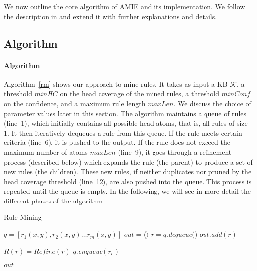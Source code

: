 
We now outline the core algorithm of AMIE and its implementation.
We follow the description in \cite{amie} and extend it with further explanations and details.

\subsection{Algorithm}
\label{subsec:algorithm}

\paragraph{Algorithm} Algorithm~\ref{rm} shows our approach to mine rules. It takes as input a KB $\mathcal{K}$, a threshold $minHC$ on the head coverage of the mined rules, 
a threshold $minConf$ on the confidence, and a maximum rule length $maxLen$. We discuss the choice of parameter values later in this section.
The algorithm maintains a queue of rules (line~1), which initially contains all possible head atoms, that is, all rules of size 1.
It then iteratively dequeues a rule from this queue.
If the rule meets certain criteria (line~6), it is pushed to the output.
If the rule does not exceed the maximum number of atoms $maxLen$ (line~9), it goes through a refinement process (described below) which
expands the rule (the parent) to produce a set of new rules (the children). These new rules, 
if neither duplicates nor pruned by the head coverage threshold (line~12),  
are also pushed into the queue.
This process is repeated until the queue is empty. 
In the following, we will see in more detail the different phases of the algorithm.

\begin{algorithm}
\caption{Rule Mining}
\label{rm}
\begin{algorithmic}[1]
    \State $q = [r_1(x,y), r_2(x,y) \dots r_m(x,y)] $
    \State $out = \langle \rangle$
	  \State $r = q.$\emph{dequeue}()
	      \State $out.$\emph{add}$(r)$	
	  \EndIf
	  
	    \State $R(r) = Refine(r)$	    
			\State $q.$\emph{enqueue}$(r_c)$		      
		    \EndIf
	    \EndFor
	    
	  \EndIf  
	  
	\EndWhile
    \State \Return $out$
\EndFunction
\end{algorithmic}
\end{algorithm}

